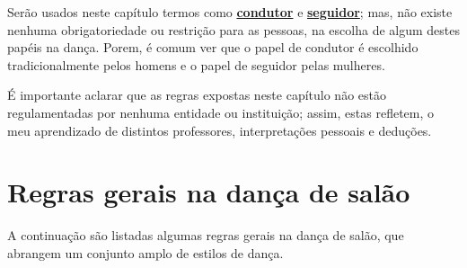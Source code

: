 Serão usados neste capítulo termos como \hyperref[def:Condutor]{\textbf{condutor}} e \hyperref[def:Seguidor]{\textbf{seguidor}}; 
mas, não existe nenhuma obrigatoriedade ou restrição para as pessoas, 
na escolha de algum destes papéis na dança.
Porem, é comum ver que o papel de condutor é escolhido tradicionalmente pelos homens e o papel de seguidor pelas mulheres.
\begin{lattention}
É importante aclarar
que as regras expostas neste capítulo não estão regulamentadas por nenhuma entidade ou instituição; assim, estas
refletem, o meu aprendizado de distintos professores,
interpretações pessoais  e deduções. 
\end{lattention}

\section{Regras gerais na dança de salão}


A continuação são listadas algumas regras gerais na dança de salão, 
que abrangem um conjunto amplo de estilos de dança.\\

